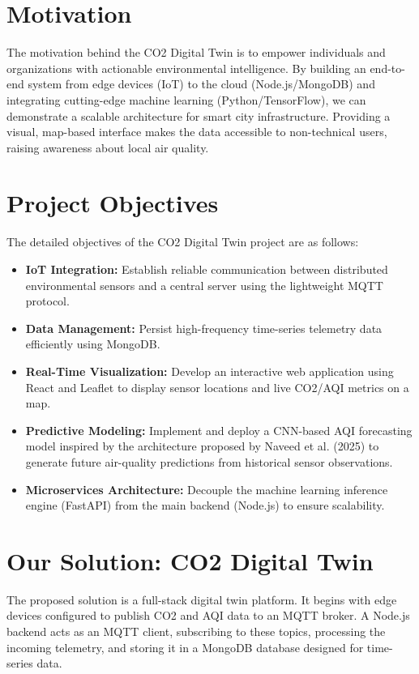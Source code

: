 \documentclass[a4paper, 12pt]{report}
\begin{document}
\section{Motivation}
The motivation behind the CO2 Digital Twin is to empower individuals and organizations with actionable environmental intelligence. By building an end-to-end system from edge devices (IoT) to the cloud (Node.js/MongoDB) and integrating cutting-edge machine learning (Python/TensorFlow), we can demonstrate a scalable architecture for smart city infrastructure. Providing a visual, map-based interface makes the data accessible to non-technical users, raising awareness about local air quality.

\section{Project Objectives}
The detailed objectives of the CO2 Digital Twin project are as follows:
\begin{itemize}
	\item \textbf{IoT Integration:} Establish reliable communication between distributed environmental sensors and a central server using the lightweight MQTT protocol.
	\item \textbf{Data Management:} Persist high-frequency time-series telemetry data efficiently using MongoDB.
	\item \textbf{Real-Time Visualization:} Develop an interactive web application using React and Leaflet to display sensor locations and live CO2/AQI metrics on a map.
	\item \textbf{Predictive Modeling:} Implement and deploy a CNN-based AQI forecasting model inspired by the architecture proposed by Naveed et al. (2025) to generate future air-quality predictions from historical sensor observations.
	\item \textbf{Microservices Architecture:} Decouple the machine learning inference engine (FastAPI) from the main backend (Node.js) to ensure scalability.
\end{itemize}

\section{Our Solution: CO2 Digital Twin}
The proposed solution is a full-stack digital twin platform. It begins with edge devices configured to publish CO2 and AQI data to an MQTT broker. A Node.js backend acts as an MQTT client, subscribing to these topics, processing the incoming telemetry, and storing it in a MongoDB database designed for time-series data. 
\end{document}
